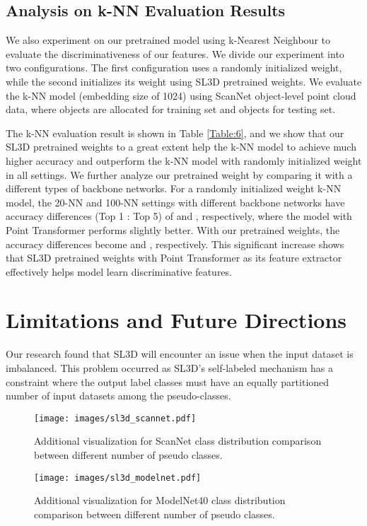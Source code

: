 \documentclass{article}
\begin{document}
\subsection{Analysis on k-NN Evaluation Results}

We also experiment on our pretrained model using k-Nearest Neighbour to evaluate the discriminativeness of our features. We divide our experiment into two configurations. The first configuration uses a randomly initialized weight, while the second  initializes its weight using SL3D pretrained weights. We evaluate the k-NN model (embedding size of 1024) using ScanNet object-level point cloud data, where  objects are allocated for training set and  objects for testing set.
 
The k-NN evaluation result is shown in Table \ref{Table:6}, and we show that our SL3D pretrained weights to a great extent help the k-NN model to achieve much higher accuracy and outperform the k-NN model with randomly initialized weight in all settings. We further analyze our pretrained weight by comparing it with a different types of backbone networks. For a randomly initialized weight k-NN model, the 20-NN and 100-NN settings with different backbone networks have accuracy differences (Top 1 : Top 5) of  and , respectively, where the model with Point Transformer performs slightly better. With our pretrained weights, the accuracy differences become  and , respectively. This significant increase shows that SL3D pretrained weights with Point Transformer as its feature extractor effectively helps model learn discriminative features.

\section{Limitations and Future Directions}
\label{sec:limit}
Our research found that SL3D will encounter an issue when the input dataset is imbalanced. This problem occurred as SL3D's self-labeled mechanism has a constraint where the output label classes must have an equally partitioned number of input datasets among the pseudo-classes. 

\begin{figure*}[ht]
\label{fig:3}
\texttt{[image: images/sl3d\_scannet.pdf]}
\caption{Additional visualization for ScanNet class distribution comparison between different number of pseudo classes.}
\end{figure*}

\begin{figure*}[ht]
\label{fig:4}
\texttt{[image: images/sl3d\_modelnet.pdf]}
\caption{Additional visualization for ModelNet40 class distribution comparison between different number of pseudo classes.}
\end{figure*}
\end{document}

